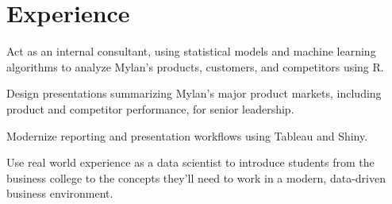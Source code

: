 \documentclass[letterpaper]{deedy-resume} %
\begin{document}
\hfill
%
%
\begin{minipage}[t]{0.63\textwidth} %


\section{Experience}
\vspace{\topsep} %
\begin{tightitemize}
\item Act as an internal consultant, using statistical models and machine learning algorithms to
  analyze Mylan's products, customers, and competitors using R.
\item Design presentations summarizing Mylan's major product markets,
  including product and competitor performance, for senior leadership.
\item Modernize reporting and presentation workflows using Tableau and
  Shiny.
\end{tightitemize}
\sectionspace %


\vspace{\topsep} %
\begin{tightitemize}
\item Use real world experience as a data scientist to introduce
  students from the business college to the concepts they'll need to
  work in a modern, data-driven  business environment.
\end{tightitemize}
\sectionspace %


\end{minipage}
\end{document}
